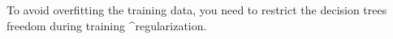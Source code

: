 To avoid overfitting the training data,
you need to restrict the decision trees freedom during training
^regularization.









































































